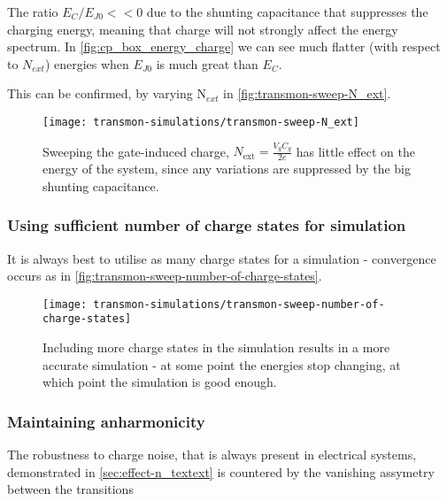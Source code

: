 The  ratio  $E_{C}/E_{J0}<<0$  due  to  the  shunting  capacitance  that
suppresses the  charging energy, meaning  that charge will  not strongly
affect  the energy  spectrum.  In  \autoref{fig:cp_box_energy_charge} we
can see much flatter (with  respect to $N_{ext}$) energies when $E_{J0}$
is much great than $E_C$.

This     can    be     confirmed,     by     varying    N$_{ext}$     in
\autoref{fig:transmon-sweep-N_ext}.

\begin{figure}[h]
  \centering
  \texttt{[image: transmon-simulations/transmon-sweep-N\_ext]}
  \caption{\small      Sweeping       the      gate-induced      charge,
    $N_{\text{ext}} =  \frac{V_{g}C_{g}}{2e}$ has  little effect  on the
    energy of the system, since any variations are suppressed by the big
    shunting capacitance. \label{fig:transmon-sweep-N_ext}}
\end{figure}

\subsubsection{Using sufficient number of charge states for simulation}
\label{sec:note-simulation}

It is always  best to utilise as  many charge states for  a simulation -
convergence                 occurs                 as                 in
\autoref{fig:transmon-sweep-number-of-charge-states}.

\begin{figure}[h]
  \centering
  \texttt{[image: transmon-simulations/transmon-sweep-number-of-charge-states]}
  \caption{\small Including more charge states in the simulation results
    in a  more accurate  simulation -  at some  point the  energies stop
    changing,    at    which    point    the    simulation    is    good
    enough.\label{fig:transmon-sweep-number-of-charge-states}}
\end{figure}

\subsubsection{Maintaining anharmonicity}
\label{sec:maint-anharm}

The robustness  to charge  noise, that is  always present  in electrical
systems, demonstrated in  \autoref{sec:effect-n_textext} is countered by
the vanishing assymetry between the transitions

